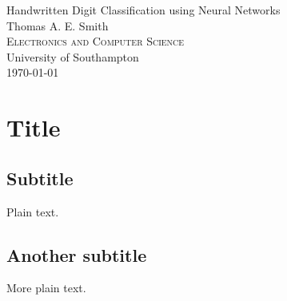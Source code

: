 \documentclass{article}     %
\begin{document}
\begin{center}

{\LARGE Handwritten Digit Classification using Neural Networks} \\[0.8cm]
{\large Thomas A. E. Smith} \\[0.8cm]
{\large \textsc{Electronics and Computer Science}} \\
{\large University of Southampton} \\[0.8cm]
{\large \today} \\[0.8cm]

\end{center}


\begin{abstract}
This report assesses the uses of single- and multi-layer perceptrons to classify data and predict the secondary structure of proteins. We begin with an introduction to the problem, and the mechanics of the algorithms proposed to solve it in this report, including mention of the state-of the art in this field. The report then covers the training and evaluation of single-layer perceptrons first on sythetic datasets of increasing complexity, and then on two-set classification of actual protein data. We then go over the application of a multi-layer perceptron to the full protein secondary structure prediction problem, and discuss some of the alterations that may be made to improve prediction accuracy. Finally, the results of predictions made using these methods are compared to previous methods and those from online prediction services.

\end{abstract}

\section{Title}

\subsection{Subtitle}

Plain text.

\subsection{Another subtitle}

More plain text.
\end{document}
